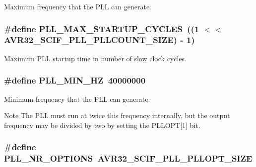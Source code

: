 \-Maximum frequency that the \-P\-L\-L can generate. 

\hypertarget{group__pll__group_ga3a7cd8f570834e0f208037619b798aef}{
\subsubsection[{\-P\-L\-L\-\_\-\-M\-A\-X\-\_\-\-S\-T\-A\-R\-T\-U\-P\-\_\-\-C\-Y\-C\-L\-E\-S}]{\setlength{\rightskip}{0pt plus 5cm}\#define \-P\-L\-L\-\_\-\-M\-A\-X\-\_\-\-S\-T\-A\-R\-T\-U\-P\-\_\-\-C\-Y\-C\-L\-E\-S~((1 $<$$<$ \-A\-V\-R32\-\_\-\-S\-C\-I\-F\-\_\-\-P\-L\-L\-\_\-\-P\-L\-L\-C\-O\-U\-N\-T\-\_\-\-S\-I\-Z\-E) -\/ 1)}}
\label{group__pll__group_ga3a7cd8f570834e0f208037619b798aef}


\-Maximum \-P\-L\-L startup time in number of slow clock cycles. 

\hypertarget{group__pll__group_ga58acd4425beaa32dad5ccffa073cb0a5}{
\subsubsection[{\-P\-L\-L\-\_\-\-M\-I\-N\-\_\-\-H\-Z}]{\setlength{\rightskip}{0pt plus 5cm}\#define \-P\-L\-L\-\_\-\-M\-I\-N\-\_\-\-H\-Z~40000000}}
\label{group__pll__group_ga58acd4425beaa32dad5ccffa073cb0a5}


\-Minimum frequency that the \-P\-L\-L can generate. 

\begin{DoxyNote}{\-Note}
\-The \-P\-L\-L must run at twice this frequency internally, but the output frequency may be divided by two by setting the \-P\-L\-L\-O\-P\-T\mbox{[}1\mbox{]} bit. 
\end{DoxyNote}
\hypertarget{group__pll__group_gae74457d5b4073fdb82cb6b9f3d8b76e2}{
\subsubsection[{\-P\-L\-L\-\_\-\-N\-R\-\_\-\-O\-P\-T\-I\-O\-N\-S}]{\setlength{\rightskip}{0pt plus 5cm}\#define \-P\-L\-L\-\_\-\-N\-R\-\_\-\-O\-P\-T\-I\-O\-N\-S~\-A\-V\-R32\-\_\-\-S\-C\-I\-F\-\_\-\-P\-L\-L\-\_\-\-P\-L\-L\-O\-P\-T\-\_\-\-S\-I\-Z\-E}}
\label{group__pll__group_gae74457d5b4073fdb82cb6b9f3d8b76e2}


